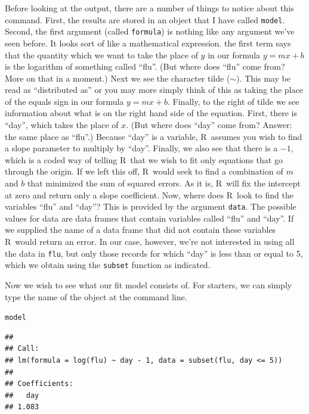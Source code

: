 \documentclass{article}\usepackage[]{graphicx}\usepackage[]{color}
\makeatletter
\newcommand{\hlstd}[1]{\textcolor[rgb]{0.345,0.345,0.345}{#1}}%
\newenvironment{kframe}{%
 \def\at@end@of@kframe{}%
 \ifinner\ifhmode%
  \def\at@end@of@kframe{\end{minipage}}%
  \begin{minipage}{\columnwidth}%
 \fi\fi%
 \def\FrameCommand##1{\hskip\@totalleftmargin \hskip-\fboxsep
 \colorbox{shadecolor}{##1}\hskip-\fboxsep
     \hskip-\linewidth \hskip-\@totalleftmargin \hskip\columnwidth}%
 \MakeFramed {\advance\hsize-\width
   \@totalleftmargin\z@ \linewidth\hsize
   \@setminipage}}%
 {\par\unskip\endMakeFramed%
 \at@end@of@kframe}
\newenvironment{knitrout}{}{} %
\newcommand{\R}{\textsf{R}}
\newcommand{\code}[1]{\texttt{#1}}
\theoremstyle{exercise}
\makeatother
\begin{document}
Before looking at the output, there are a number of things to notice about this command. First, the results are stored in an object that I have called \code{model}. Second, the first argument (called \code{formula}) is nothing like any argument we've seen before. It looks sort of like a mathematical expression. the first term says that the quantity which we want to take the place of $y$ in our formula $y=mx+b$ is the logarithm of something called ``flu''. (But where does ``flu'' come from? More on that in a moment.) Next we see the character tilde ($\sim$). This may be read as ``distributed as'' or you may more simply think of this as taking the place of the equals sign in our formula $y=mx+b$. Finally, to the right of tilde we see information about what is on the right hand side of the equation. First, there is ``day'', which takes the place of $x$. (But where does ``day'' come from? Answer: the same place as ``flu''.) Because ``day'' is a variable, \R\ assumes you wish to find a slope parameter to multiply by ``day''. Finally, we also see that there is a $-1$, which is a coded way of telling \R\ that we wish to fit only equations that go through the origin. If we left this off, \R\ would seek to find a combination of $m$ and $b$ that minimized the sum of squared errors. As it is, \R\ will fix the intercept at zero and return only a slope coefficient. Now, where does \R\ look to find the variables ``flu'' and ``day''? This is provided by the argument \code{data}. The possible values for data are data frames that contain variables called ``flu'' and ``day''. If we supplied the name of a data frame that did not contain these variables \R\ would return an error. In our case, however, we're not interested in using all the data in \code{flu}, but only those records for which ``day'' is less than or equal to 5, which we obtain using the \code{subset} function as indicated.

Now we wish to see what our fit model consists of. For starters, we can simply type the name of the object at the command line.

\begin{knitrout}
\color{fgcolor}\begin{kframe}
\begin{alltt}
\hlstd{model}
\end{alltt}
\begin{verbatim}
## 
## Call:
## lm(formula = log(flu) ~ day - 1, data = subset(flu, day <= 5))
## 
## Coefficients:
##   day  
## 1.083
\end{verbatim}
\end{kframe}
\end{knitrout}
\end{document}
